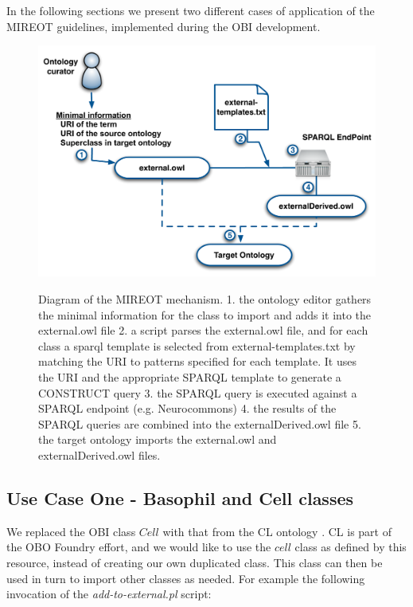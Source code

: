 \documentclass{ao2e}%
\begin{document}
In the following sections we present two different cases of application of the \ac{MIREOT} guidelines, implemented during the \ac{OBI} development.

\begin{figure}[t]
\centering
{
\includegraphics[width=.9\linewidth]{./figs/mechanism2.pdf}
}
\caption{Diagram of the MIREOT mechanism.
1. the ontology editor gathers the minimal information for the class to import and adds it into the external.owl file
2. a script parses the external.owl file, and for each class a sparql template is selected from external-templates.txt by matching the URI to patterns specified for each template. It uses the URI and the appropriate SPARQL template to generate a CONSTRUCT query
3. the SPARQL query is executed against a SPARQL endpoint (e.g. Neurocommons)
4. the results of the SPARQL queries are combined into the externalDerived.owl file
5. the target ontology imports the external.owl and externalDerived.owl files.
}
\label{fig:mechanism2}
\end{figure}




\subsection*{Use Case One - Basophil and Cell classes}

We replaced the \ac{OBI} class $Cell$ with that from the \ac{CL} ontology \cite{CL}. 
\ac{CL} is part of the \ac{OBO} Foundry effort, and we would like to use the $cell$ class as defined by this resource, instead of creating our own duplicated class.
This class can then be used in turn to import other classes as needed.
For example the following invocation of the \emph{add-to-external.pl} script:
\end{document}
